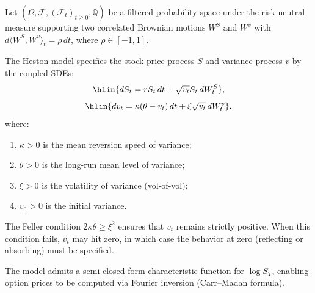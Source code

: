 \begin{definition} \label{definition:heston_stochastic_volatility_model_for_asset_prices}
Let $(\Omega, \mathcal{F}, (\mathcal{F}_t)_{t \geq 0}, \mathbb{Q})$ be a filtered probability space under the risk-neutral measure supporting two correlated Brownian motions $W^S$ and $W^v$ with $d\langle W^S, W^v \rangle_t = \rho \, dt$, where $\rho \in [-1, 1]$.

The Heston model specifies the stock price process $S$ and variance process $v$ by the coupled SDEs:
$$\hlin{dS_t = r S_t \, dt + \sqrt{v_t} S_t \, dW^S_t},$$
$$\hlin{dv_t = \kappa(\theta - v_t) \, dt + \xi\sqrt{v_t} \, dW^v_t},$$
where:

\begin{enumerate}
    \item $\kappa > 0$ is the mean reversion speed of variance;
    \item $\theta > 0$ is the long-run mean level of variance;
    \item $\xi > 0$ is the volatility of variance (vol-of-vol);
    \item $v_0 > 0$ is the initial variance.
\end{enumerate}

The Feller condition $2\kappa\theta \geq \xi^2$ ensures that $v_t$ remains strictly positive. When this condition fails, $v_t$ may hit zero, in which case the behavior at zero (reflecting or absorbing) must be specified.

The model admits a semi-closed-form characteristic function for $\log S_T$, enabling option prices to be computed via Fourier inversion (Carr--Madan formula).
\end{definition}
